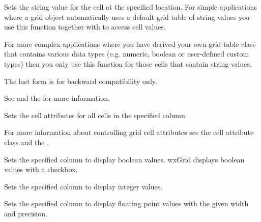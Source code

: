 Sets the string value for the cell at the specified location. For simple applications where a
grid object automatically uses a default grid table of string values you use this function together
with  to access cell values. 

For more complex applications where you have derived your own grid table class that contains
various data types (e.g. numeric, boolean or user-defined custom types) then you only use this
function for those cells that contain string values.

The last form is for backward compatibility only.

See 
and the  for more information.

\label{wxgridsetcolattr}


Sets the cell attributes for all cells in the specified column.

For more information about controlling grid cell attributes see the 
 cell attribute class and the 
.

\label{wxgridsetcolformatbool}


Sets the specified column to display boolean values. wxGrid displays boolean values with a checkbox.

\label{wxgridsetcolformatnumber}


Sets the specified column to display integer values.

\label{wxgridsetcolformatfloat}


Sets the specified column to display floating point values with the given width and precision.

\label{wxgridsetcolformatcustom}


